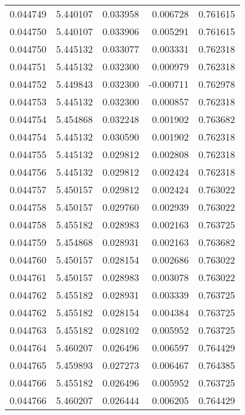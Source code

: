 \begin{tabular}{lrrrr}
0.044749    &  5.440107 &  0.033958 &  0.006728 &             0.761615 \\
0.044750    &  5.440107 &  0.033906 &  0.005291 &             0.761615 \\
0.044750    &  5.445132 &  0.033077 &  0.003331 &             0.762318 \\
0.044751    &  5.445132 &  0.032300 &  0.000979 &             0.762318 \\
0.044752    &  5.449843 &  0.032300 & -0.000711 &             0.762978 \\
0.044753    &  5.445132 &  0.032300 &  0.000857 &             0.762318 \\
0.044754    &  5.454868 &  0.032248 &  0.001902 &             0.763682 \\
0.044754    &  5.445132 &  0.030590 &  0.001902 &             0.762318 \\
0.044755    &  5.445132 &  0.029812 &  0.002808 &             0.762318 \\
0.044756    &  5.445132 &  0.029812 &  0.002424 &             0.762318 \\
0.044757    &  5.450157 &  0.029812 &  0.002424 &             0.763022 \\
0.044758    &  5.450157 &  0.029760 &  0.002939 &             0.763022 \\
0.044758    &  5.455182 &  0.028983 &  0.002163 &             0.763725 \\
0.044759    &  5.454868 &  0.028931 &  0.002163 &             0.763682 \\
0.044760    &  5.450157 &  0.028154 &  0.002686 &             0.763022 \\
0.044761    &  5.450157 &  0.028983 &  0.003078 &             0.763022 \\
0.044762    &  5.455182 &  0.028931 &  0.003339 &             0.763725 \\
0.044762    &  5.455182 &  0.028154 &  0.004384 &             0.763725 \\
0.044763    &  5.455182 &  0.028102 &  0.005952 &             0.763725 \\
0.044764    &  5.460207 &  0.026496 &  0.006597 &             0.764429 \\
0.044765    &  5.459893 &  0.027273 &  0.006467 &             0.764385 \\
0.044766    &  5.455182 &  0.026496 &  0.005952 &             0.763725 \\
0.044766    &  5.460207 &  0.026444 &  0.006205 &             0.764429 \\

\end{tabular}
